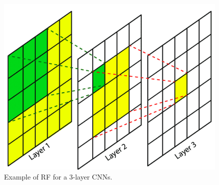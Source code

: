 \documentclass[12pt]{article}%
\begin{document}
\begin{figure}[h]
    \centering
    \includegraphics[width=0.3\linewidth]{HW5/receptive-field-in-convolutional-networks.png}
    \caption{Example of RF for a 3-layer CNNs.}
    \label{fig:my_label}
\end{figure}


\end{document}

